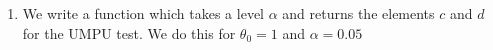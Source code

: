 \documentclass[12pt, a4paper]{article}\usepackage[]{graphicx}\usepackage[]{color}
\begin{document}
\begin{enumerate}[label={\bfseries\arabic*.}]
\begin{enumerate}[label={(\alph*)}]
\begin{Schunk}
{}

\end{Schunk}
\item We write a function which takes a level $\alpha$ and returns the elements $c$ and $d$ for the UMPU test. We do this for $\theta_0 = 1$ and $\alpha = 0.05$
  \end{enumerate}
\end{enumerate}
\end{document}
